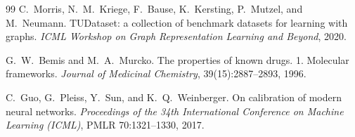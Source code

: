 \begin{thebibliography}{99}
 C.~Morris, N.~M.~Kriege, F.~Bause, K.~Kersting, P.~Mutzel,
and M.~Neumann. TUDataset: a collection of benchmark datasets for learning with
graphs. \emph{ICML Workshop on Graph Representation Learning and Beyond}, 2020.

 G.~W.~Bemis and M.~A.~Murcko. The properties of known drugs.
1. Molecular frameworks. \emph{Journal of Medicinal Chemistry},
39(15):2887--2893, 1996.

 C.~Guo, G.~Pleiss, Y.~Sun, and K.~Q.~Weinberger. On
calibration of modern neural networks. \emph{Proceedings of the 34th
International Conference on Machine Learning (ICML)}, PMLR 70:1321--1330, 2017.

\end{thebibliography}
